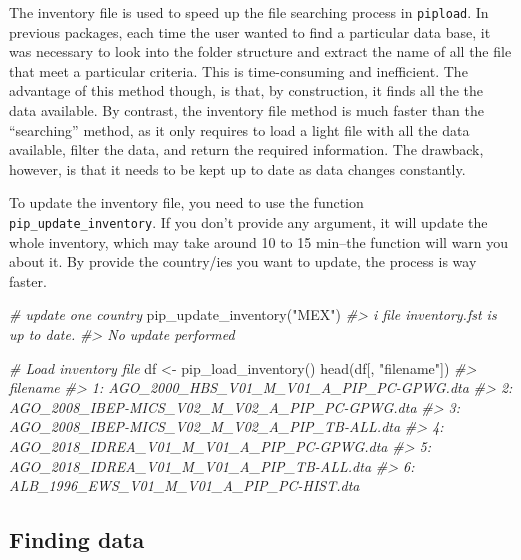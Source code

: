 \documentclass[
]{book}
\newenvironment{Shaded}{\begin{snugshade}}{\end{snugshade}}
\newcommand{\CommentTok}[1]{\textcolor[rgb]{0.56,0.35,0.01}{\textit{#1}}}
\newcommand{\FunctionTok}[1]{\textcolor[rgb]{0.00,0.00,0.00}{#1}}
\newcommand{\NormalTok}[1]{#1}
\newcommand{\OtherTok}[1]{\textcolor[rgb]{0.56,0.35,0.01}{#1}}
\newcommand{\StringTok}[1]{\textcolor[rgb]{0.31,0.60,0.02}{#1}}
\begin{document}
The inventory file is used to speed up the file searching process in \texttt{pipload}. In previous packages, each time the user wanted to find a particular data base, it was necessary to look into the folder structure and extract the name of all the file that meet a particular criteria. This is time-consuming and inefficient. The advantage of this method though, is that, by construction, it finds all the the data available. By contrast, the inventory file method is much faster than the ``searching'' method, as it only requires to load a light file with all the data available, filter the data, and return the required information. The drawback, however, is that it needs to be kept up to date as data changes constantly.

To update the inventory file, you need to use the function \texttt{pip\_update\_inventory}. If you don't provide any argument, it will update the whole inventory, which may take around 10 to 15 min--the function will warn you about it. By provide the country/ies you want to update, the process is way faster.

\begin{Shaded}
\begin{Highlighting}[]
\CommentTok{\# update one country}
\FunctionTok{pip\_update\_inventory}\NormalTok{(}\StringTok{"MEX"}\NormalTok{)}
\CommentTok{\#\textgreater{} i file \textquotesingle{}inventory.fst\textquotesingle{} is up to date.}
\CommentTok{\#\textgreater{} No update performed}

\CommentTok{\# Load inventory file}
\NormalTok{df }\OtherTok{\textless{}{-}} \FunctionTok{pip\_load\_inventory}\NormalTok{()}
\FunctionTok{head}\NormalTok{(df[, }\StringTok{"filename"}\NormalTok{])}
\CommentTok{\#\textgreater{}                                          filename}
\CommentTok{\#\textgreater{} 1:       AGO\_2000\_HBS\_V01\_M\_V01\_A\_PIP\_PC{-}GPWG.dta}
\CommentTok{\#\textgreater{} 2: AGO\_2008\_IBEP{-}MICS\_V02\_M\_V02\_A\_PIP\_PC{-}GPWG.dta}
\CommentTok{\#\textgreater{} 3:  AGO\_2008\_IBEP{-}MICS\_V02\_M\_V02\_A\_PIP\_TB{-}ALL.dta}
\CommentTok{\#\textgreater{} 4:     AGO\_2018\_IDREA\_V01\_M\_V01\_A\_PIP\_PC{-}GPWG.dta}
\CommentTok{\#\textgreater{} 5:      AGO\_2018\_IDREA\_V01\_M\_V01\_A\_PIP\_TB{-}ALL.dta}
\CommentTok{\#\textgreater{} 6:       ALB\_1996\_EWS\_V01\_M\_V01\_A\_PIP\_PC{-}HIST.dta}
\end{Highlighting}
\end{Shaded}

\hypertarget{finding-data}{%
\subsection{Finding data}\label{finding-data}}
\end{document}
